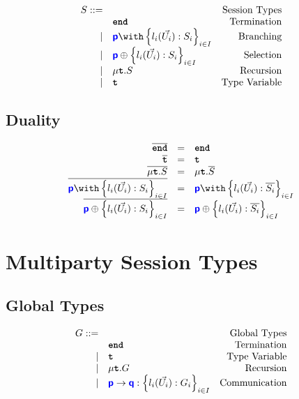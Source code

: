 \documentclass{article}
\begin{document}
\doublespacing
\[
\begin{array}{rlr}
    S ::= & & \text{Session Types} \\
     & \tyend & \text{Termination} \\
		\mid & \tybra{p}{l_i(\vec{U_i}): S_i}{i \in I} & \text{Branching} \\
		\mid & \tysel{p}{l_i(\vec{U_i}): S_i}{i \in I} & \text{Selection} \\
		\mid & \tyrec{S} & \text{Recursion} \\
		\mid & \tyrecvar & \text{Type Variable} \\
\end{array}
\]
\singlespacing

\subsection{Duality}
\doublespacing
\[
\begin{array}{rcl}
		\dual{\tyend} & = & \tyend \\
		\dual{\tyrecvar} & = & \tyrecvar \\
		\dual{\tyrec{S}} & = & \tyrec{\dual{S}} \\
		\dual{\tybra{p}{l_i(\vec{U_i}): S_i}{i \in I}} & = & \tybra{p}{l_i(\vec{U_i}): \dual{S_i}}{i \in I} \\
		\dual{\tysel{p}{l_i(\vec{U_i}): S_i}{i \in I}} & = & \tysel{p}{l_i(\vec{U_i}): \dual{S_i}}{i \in I} \\
\end{array}
\]
\singlespacing

\section{Multiparty Session Types}

\subsection{Global Types}

\doublespacing
\[
\begin{array}{rlr}
    G ::= & & \text{Global Types} \\
     & \textbf{\texttt{end}} & \text{Termination} \\
	\mid & \textbf{\texttt{t}} & \text{Type Variable} \\
	\mid & \mu\textbf{\texttt{t}}.{G} & \text{Recursion} \\
	\mid & {\color{blue}\bm{\mathsf{p}}} \to {\color{blue}\bm{\mathsf{q}}} : \left\{ {l_i(\vec{U_i}): G_i} \right\}_{i \in I} & \text{Communication} \\
\end{array}
\]
\singlespacing
\end{document}
